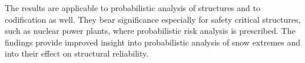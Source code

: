 The results are applicable to probabilistic analysis of structures and to codification as well. They bear significance especially for safety critical structures, such as nuclear power plants, where probabilistic risk analysis is prescribed. The findings provide improved insight into probabilistic analysis of snow extremes and into their effect on structural reliability.


%
%


